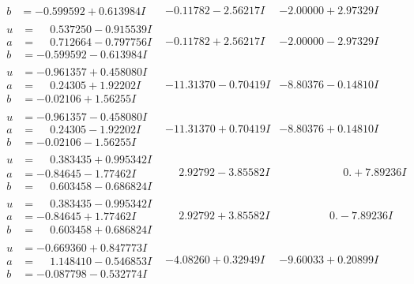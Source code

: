 \documentclass[1p]{elsarticle_modified}
\theoremstyle{definition}
\begin{document}
$$\begin{array}{c|c|c}
\begin{aligned}
b &= -0.599592 + 0.613984 I\end{aligned}
 & -0.11782 - 2.56217 I & -2.00000 + 2.97329 I \\ \hline\begin{aligned}
u &= \phantom{-}0.537250 - 0.915539 I \\
a &= \phantom{-}0.712664 - 0.797756 I \\
b &= -0.599592 - 0.613984 I\end{aligned}
 & -0.11782 + 2.56217 I & -2.00000 - 2.97329 I \\ \hline\begin{aligned}
u &= -0.961357 + 0.458080 I \\
a &= \phantom{-}0.24305 + 1.92202 I \\
b &= -0.02106 + 1.56255 I\end{aligned}
 & -11.31370 - 0.70419 I & -8.80376 - 0.14810 I \\ \hline\begin{aligned}
u &= -0.961357 - 0.458080 I \\
a &= \phantom{-}0.24305 - 1.92202 I \\
b &= -0.02106 - 1.56255 I\end{aligned}
 & -11.31370 + 0.70419 I & -8.80376 + 0.14810 I \\ \hline\begin{aligned}
u &= \phantom{-}0.383435 + 0.995342 I \\
a &= -0.84645 - 1.77462 I \\
b &= \phantom{-}0.603458 - 0.686824 I\end{aligned}
 & \phantom{-}2.92792 - 3.85582 I & \phantom{-0.000000 -}0. + 7.89236 I \\ \hline\begin{aligned}
u &= \phantom{-}0.383435 - 0.995342 I \\
a &= -0.84645 + 1.77462 I \\
b &= \phantom{-}0.603458 + 0.686824 I\end{aligned}
 & \phantom{-}2.92792 + 3.85582 I & \phantom{-0.000000 } 0. - 7.89236 I \\ \hline\begin{aligned}
u &= -0.669360 + 0.847773 I \\
a &= \phantom{-}1.148410 - 0.546853 I \\
b &= -0.087798 - 0.532774 I\end{aligned}
 & -4.08260 + 0.32949 I & -9.60033 + 0.20899 I \\ \hline\begin{aligned}

\end{aligned}
\end{array}$$
\end{document}
